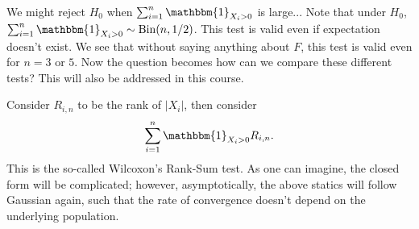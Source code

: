 We might reject \(H_0\) when \(\sum_{i=1}^{n} \mathbbm{1}_{X_i > 0} \) is large... Note that under \(H_0\), \(\sum_{i=1}^{n} \mathbbm{1}_{X_i > 0} \sim \operatorname{Bin}(n, 1/2) \). This test is valid even if expectation doesn't exist. We see that without saying anything about \(F\), this test is valid even for \(n = 3\) or \(5\). Now the question becomes how can we compare these different tests? This will also be addressed in this course.

Consider \(R_{i, n} \) to be the rank of \(\vert X_i \vert \), then consider
\[
	\sum_{i=1}^{n} \mathbbm{1}_{X_i > 0} R_{i, n}.
\]
This is the so-called Wilcoxon's Rank-Sum test. As one can imagine, the closed form will be complicated; however, asymptotically, the above statics will follow Gaussian again, such that the rate of convergence doesn't depend on the underlying population.